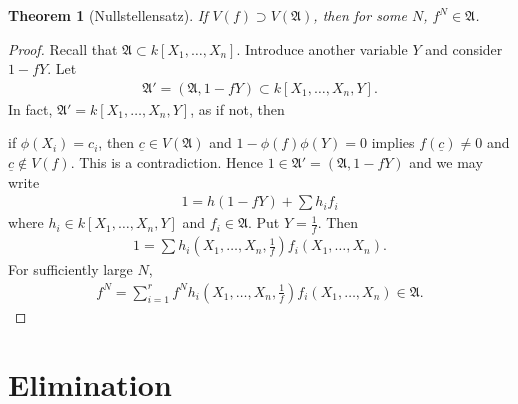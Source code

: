 \documentclass[12pt]{report}
\theoremstyle{plain}
\newtheorem{theorem}{Theorem}[section]
\theoremstyle{remark}
\theoremstyle{definition}
\begin{document}
\begin{theorem}[Nullstellensatz]
    If $V(f)\supset V(\mathfrak{A})$, then for some $N$, $f^N\in\mathfrak{A}$.
\end{theorem}
\begin{proof}
    Recall that $\mathfrak{A}\subset k[X_1,\dots,X_n]$. Introduce another variable $Y$ and consider $1-fY$. Let
    \begin{align*}
        \mathfrak{A}'=(\mathfrak{A},1-fY)\subset k[X_1,\dots,X_n,Y].
    \end{align*}
    In fact, $\mathfrak{A}'=k[X_1,\dots,X_n,Y]$, as if not, then
    \begin{figure}[H]
        \centering
    \end{figure}
    \noindent if $\phi(X_i)=c_i$, then $\underline{c}\in V(\mathfrak{A})$ and $1-\phi(f)\phi(Y)=0$ implies $f(\underline{c})\neq 0$ and $\underline{c}\notin V(f)$. This is a contradiction. Hence $1\in\mathfrak{A}'=(\mathfrak{A},1-fY)$ and we may write
    \begin{align*}
        1=h(1-fY)+\sum h_i f_i
    \end{align*}
    where $h_i\in k[X_1,\dots,X_n,Y]$ and $f_i\in\mathfrak{A}$. Put $Y=\frac{1}{f}$. Then
    \begin{align*}
        1=\sum h_i\left(X_1,\dots,X_n,\frac{1}{f}\right) f_i(X_1,\dots,X_n).
    \end{align*}
    For sufficiently large $N$,
    \begin{align*}
        f^N=\sum_{i=1}^r f^N h_i\left(X_1,\dots,X_n,\frac{1}{f}\right) f_i(X_1,\dots,X_n) \in \mathfrak{A}.
    \end{align*}
\end{proof}








\section{Elimination}
\end{document}
